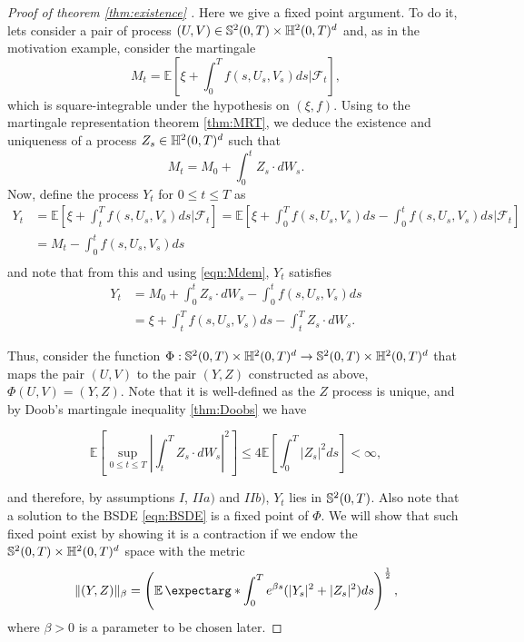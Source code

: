 \begin{proof}[Proof of theorem \ref{thm:existence} ]
Here we give a fixed point argument. To do it, lets consider a pair of process $(U,V)\in\mathbb{S}^2(0,T)\times\mathbb{H}^2(0,T)^d$ and, as in the motivation example, consider the martingale
\begin{equation}
	M_t=\mathbb{E}\left[\xi +\int_{0}^{T}f(s,U_s,V_s)ds \Bigg| \mathcal{F}_t \right],
\end{equation}
which is square-integrable under the hypothesis on $(\xi,f)$. Using to the martingale representation theorem \ref{thm:MRT}, we deduce the existence and uniqueness of a process $Z_s\in \mathbb{H}^2(0,T)^d$ such that
\begin{equation}
	\label{eqn:Mdem}
	M_t=M_0+\int_{0}^{t}Z_s \cdot dW_s.
\end{equation}
Now, define the process $Y_t$ for $0\leq t\leq T$ as
\begin{equation}
	\begin{split}
	Y_t&=\mathbb{E}\left[\xi +\int_{t}^{T}f(s,U_s,V_s)ds \Bigg| \mathcal{F}_t \right]=\mathbb{E}\left[\xi +\int_{0}^{T}f(s,U_s,V_s)ds-\int_{0}^{t}f(s,U_s,V_s)ds  \Bigg| \mathcal{F}_t \right]\\
	&=M_t-\int_{0}^{t}f(s,U_s,V_s)ds\\
	\end{split}
\end{equation}
and note that from this and using \eqref{eqn:Mdem}, $Y_t$ satisfies 
\begin{equation}
	\label{eqn:SdeY}
	\begin{split}
		Y_t&=M_0+\int_{0}^{t}Z_s \cdot dW_s-\int_{0}^{t}f(s,U_s,V_s)ds\\
		&=\xi+\int_{t}^{T}f(s,U_s,V_s)ds-\int_{t}^{T} Z_s\cdot dW_s.
	\end{split}
\end{equation}


Thus, consider the function $\Phi:\mathbb{S}^2(0,T)\times\mathbb{H}^2(0,T)^d \to \mathbb{S}^2(0,T)\times\mathbb{H}^2(0,T)^d$ that maps the pair $(U,V)$ to the pair $(Y,Z)$ constructed as above, $\Phi(U,V)=(Y,Z)$. Note that it is well-defined as the $Z$ process is unique, and by Doob's martingale inequality \ref{thm:Doobs} we have
\begin{shaded*}
\begin{equation}
	\mathbb{E}\left[\sup_{0\leq t\leq T}\left|\int_{t}^{T}Z_s\cdot dW_s\right|^2\right]\leq 4\mathbb{E}\left[\int_{0}^{T}|Z_s|^2ds\right]<\infty,
\end{equation}\end{shaded*}
and therefore, by assumptions $I$, $II a)$ and $II b)$, $Y_t$ lies in $\mathbb{S}^2(0,T)$. Also note that a solution to the BSDE \eqref{eqn:BSDE} is a fixed point of $\Phi$. We will show that such fixed point exist by showing it is a contraction if we endow the $\mathbb{S}^2(0,T)\times\mathbb{H}^2(0,T)^d$ space with the metric 
\begin{equation}
	\lVert(Y,Z)\rVert_\beta=\left(\expect*{\int_{0}^{T}e^{\beta s}(  |Y_s|^2+|Z_s|^2)ds}\right)^{\frac{1}{2}},
\end{equation}
where $\beta>0$ is a parameter to be chosen later.


\end{proof}
